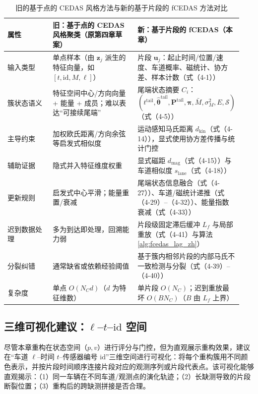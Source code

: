 \documentclass{xdupgthesis}
\begin{document}
\begin{table}[htbp]
	\centering
	\caption{旧的基于点的 CEDAS 风格方法与新的基于片段的 fCEDAS 方法对比}
	\label{tab:cedas_old_new_zh}
	\begin{tabular}{p{0.20\linewidth} p{0.37\linewidth} p{0.37\linewidth}}
		\hline
		属性 & 旧：基于点的 CEDAS 风格聚类（原第四章草案） & 新：基于片段的 fCEDAS（本章）\\
		\hline
		输入类型 & 单点样本（由 $\mathbf{z}_j$ 派生的特征向量，如 $[t,\mathrm{id},M,\ell]$） & 片段 $\mathbf{u}_j$：起止时间/位置/速度、车道概率、磁统计、协方差、样本计数（式（4-1））\\
		簇状态语义 & 特征空间中心/方向向量 + 能量 + 成员；难以表达“可接续尾端” & 尾端状态摘要 $C_i$：$(t^{\mathrm{tail}},\hat{\boldsymbol{\theta}}^{\mathrm{tail}},\mathbf{P}^{\mathrm{tail}},\boldsymbol{\pi},\bar M,\sigma_M^2,E,\mathcal{S})$（式（4-5））\\
		主导约束 & 加权欧氏距离/方向余弦等启发式相似度 & 运动感知马氏距离 $d_{\mathrm{kin}}$（式（4-14）），显式使用协方差传播与统计门控\\
		辅助证据 & 隐式并入特征维度权重 & 显式磁距 $d_{\mathrm{mag}}$（式（4-15））与车道相似度 $s_{\mathrm{lane}}$（式（4-18））\\
		更新规则 & 启发式中心平滑；能量重置/衰减 & 尾端状态信息融合（式（4-27））、车道/磁统计递推（式（4-29）--（4-32））、能量指数衰减（式（4-33））\\
		迟到数据处理 & 多为到达即处理，回溯能力弱 & 片段级固定滞后缓冲 $L_f$ 与局部重放（式（4-41）与算法 \ref{alg:fcedas_lag_zh}）\\
		分裂纠错 & 通常缺省或依赖经验阈值 & 基于簇内相邻片段的内部马氏不一致检测与分裂（式（4-39）--（4-40））\\
		复杂度 & 单点 $O(N_C d)$（$d$ 为特征维数） & 单片段 $O(N_C)$；迟到重放最坏 $O(BN_C)$（$B$ 由 $L_f$ 上界）\\
		\hline
	\end{tabular}
\end{table}

\subsection{三维可视化建议：$\ell$--$t$--$\mathrm{id}$ 空间}
尽管本章重构在状态空间（$p,v$）进行评分与门控，但为直观展示重构效果，建议在“车道 $\ell$--时间 $t$--传感器编号 $\mathrm{id}$”三维空间进行可视化：将每个重构簇用不同颜色表示，并按片段时间顺序连接片段对应的观测序列或片段代表点。该可视化能够直观揭示：（1）同一车辆在不同车道/观测点的演化轨迹；（2）长缺测导致的片段断裂位置；（3）重构后的跨缺测拼接是否合理。
\end{document}
